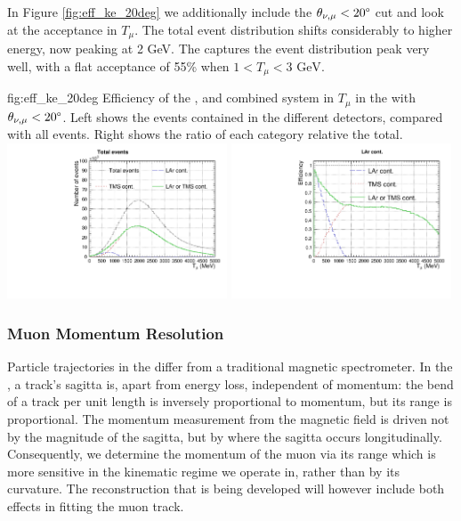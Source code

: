 In Figure \ref{fig:eff_ke_20deg} we additionally include the $\theta_{\nu,\mu}<20\degree$ cut and look at the acceptance in $T_\mu$. The total event distribution shifts considerably to higher energy, now peaking at 2 GeV. The  captures the event distribution peak very well, with a flat acceptance of 55\% when $1 < T_\mu < 3 \text{ GeV}$.
\begin{dunefigure}{fig:eff_ke_20deg}
{Efficiency of the ,  and combined system in $T_\mu$ in the  with $\theta_{\nu,\mu}<20\degree$. Left shows the events contained in the different detectors, compared with all events. Right shows the ratio of each category relative the total.}
\includegraphics[width=0.49\textwidth, clip, trim={0mm 0mm 0mm 10mm}]{graphics/tms/Simulation/Efficiency/eff_muke_th20.pdf} \includegraphics[width=0.49\textwidth, clip, trim={0mm 0mm 0mm 10mm}]{graphics/tms/Simulation/Efficiency/eff_muke_th20_ratio.pdf}
\end{dunefigure}

\subsubsection{Muon Momentum Resolution}
\label{sec:muonres}
Particle trajectories in the  differ from a traditional magnetic spectrometer. In the , a track's sagitta is, apart from energy loss, independent of momentum: the bend of a track per unit length is inversely proportional to momentum, but its range is proportional. The momentum measurement from the magnetic field is driven not by the magnitude of the sagitta, but by where the sagitta occurs longitudinally. Consequently, we determine the momentum of the muon via its range which is more sensitive in the kinematic regime we operate in, rather than by its curvature. The reconstruction that is being developed will however include both effects in fitting the muon track.

